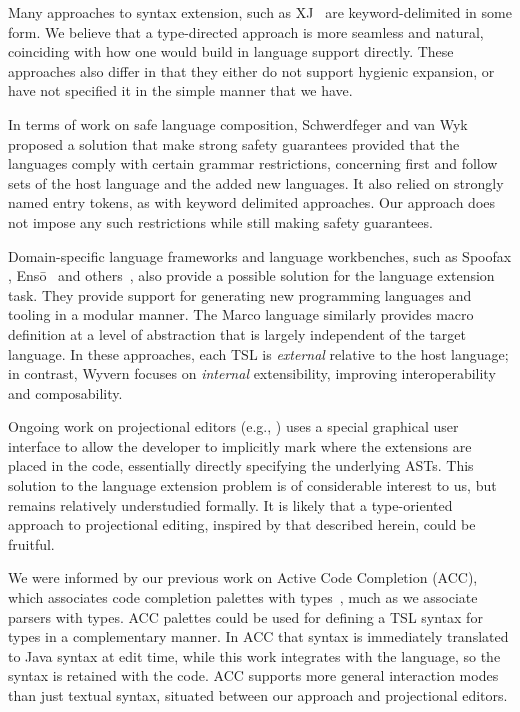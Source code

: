 Many approaches to syntax extension, such as XJ~\cite{DBLP:conf/scam/ClarkSW08} are keyword-delimited in some form. We believe that a type-directed approach is more seamless and natural, coinciding with how one would build in language support directly. These approaches also differ in that they either do not support hygienic expansion, or have not specified it in the simple manner that we have.

In terms of work on safe language composition, Schwerdfeger and van Wyk~\cite{Schwerdfeger:2009:VCD:1542476.1542499} proposed a solution that make strong safety guarantees provided that the languages comply with certain grammar restrictions, concerning first and follow sets of the host language and the added new languages. It also relied on strongly named entry tokens, as with keyword delimited approaches. Our approach does not impose any such restrictions while still making safety guarantees.%


Domain-specific language frameworks and language workbenches, such as Spoofax \cite{KatsVisser2010}, Ens\={o}~\cite{enso} and others~\cite{van1992pregmatic}, also provide a possible solution for the language extension task. They provide support for generating new programming languages and tooling in a modular manner.  The Marco language \cite{lee:2012:marco} similarly provides macro definition at a level of abstraction that is largely independent of the target language. In these approaches, each TSL is \emph{external} relative to the host language; in contrast, Wyvern focuses on \emph{internal} extensibility, improving interoperability and composability.

Ongoing work on projectional editors (e.g., \cite{mps,Diekmann:2013}) uses a special graphical user interface to allow the developer to implicitly mark where the extensions are placed in the code, essentially directly specifying the underlying ASTs. This solution to the language extension problem is of considerable interest to us, but remains relatively understudied formally. It is likely that a type-oriented approach to projectional editing, inspired by that described herein, could be fruitful. 

We were informed by our previous work on Active Code Completion (ACC), which associates code completion palettes with types~\cite{omar2012active}, much as we associate parsers with types. ACC palettes could be used for defining a TSL syntax for types in a complementary manner. In ACC that syntax
is immediately translated to Java syntax at edit time, while this work
integrates with the language, so the syntax is retained with the code. ACC supports more general interaction modes than just textual syntax, situated between our approach and projectional editors.
